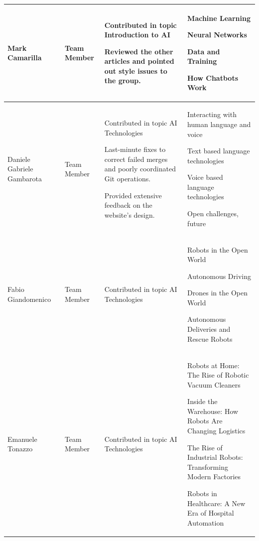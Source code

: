 \documentclass[11pt]{article}
\begin{document}
\begin{longtable} [c] {|p{3cm}|l|p{7cm}|p{4cm}|}
	Mark Camarilla & Team Member &
	\par \textbullet{} Contributed in topic Introduction to AI
	\par \textbullet{} Reviewed the other articles and pointed out style issues to the group. &
	\par \textbullet{} Machine Learning
	\par \textbullet{} Neural Networks
	\par \textbullet{} Data and Training
	\par \textbullet{} How Chatbots Work \\ 
	\hline
	
	Daniele Gabriele Gambarota & Team Member &
	\par \textbullet{} Contributed in topic AI Technologies
	\par \textbullet{} Last-minute fixes to correct failed merges and poorly coordinated Git operations.
	\par \textbullet{} Provided extensive feedback on the website's design. &
	\par \textbullet{} Interacting with human language and voice
	\par \textbullet{} Text based language technologies
	\par \textbullet{} Voice based language technologies
	\par \textbullet{} Open challenges, future \\ 
	\hline
	
	Fabio Giandomenico & Team Member &
	\par \textbullet{} Contributed in topic AI Technologies &
	\par \textbullet{} Robots in the Open World
	\par \textbullet{} Autonomous Driving
	\par \textbullet{} Drones in the Open World
	\par \textbullet{} Autonomous Deliveries and Rescue Robots \\ 
	\hline
	
	Emanuele Tonazzo & Team Member &
	\par \textbullet{} Contributed in topic AI Technologies &
	\par \textbullet{} Robots at Home: The Rise of Robotic Vacuum Cleaners
	\par \textbullet{} Inside the Warehouse: How Robots Are Changing Logistics
	\par \textbullet{} The Rise of Industrial Robots: Transforming Modern Factories
	\par \textbullet{} Robots in Healthcare: A New Era of Hospital Automation \\ 
	\hline
	

\end{longtable}
\end{document}
